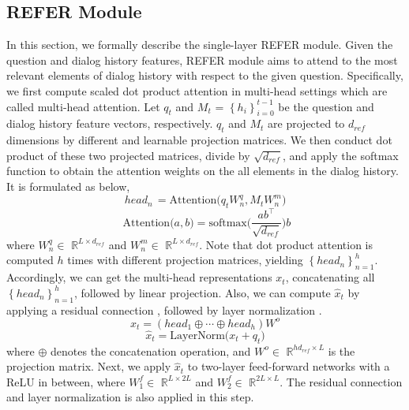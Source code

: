 \documentclass[11pt,a4paper]{article}
\begin{document}
\subsection{REFER Module}
\label{sec:refer}
In this section, we formally describe the single-layer REFER module. Given the question and dialog history features, REFER module aims to attend to the 
most relevant elements of dialog history with respect to the given question. Specifically, we first compute scaled dot product attention \cite{vaswani2017attention} in multi-head settings which are called multi-head attention. Let $q_{t}$ and $M_{t}$ = {\it $\left\{h_{i} \right\}_{i=0}^{t-1}$} be the question and dialog history feature vectors, respectively.  $q_{t}$ and $M_{t}$ are projected to $d_{ref}$ dimensions by different and learnable projection matrices. We then conduct dot product of these two projected matrices, divide by $\sqrt{d_{ref}}$, and apply the softmax function to obtain the attention weights on the all elements in the dialog history. It is formulated as below,
\begin{equation}
    head_n \mathrm{\, = Attention (} {q_{t}}W_n^q, {M_{t}}W_n^m \mathrm{)} 
\end{equation}
\begin{equation}
    \mathrm{\; Attention(} {a, b}  \mathrm{) = softmax(} { \frac{{ab}^\top}{\sqrt{{d_{ref}}}} \mathrm{)}}{b}
\end{equation}
where $W_n^q \in$ $\mathbb{R}^{L \times d_{ref}}$ and $W_n^m \in$ $\mathbb{R}^{L \times d_{ref}}$.  Note that dot product attention is computed $h$ times with different projection matrices, yielding {\it $\left\{head_n \right\}_{n=1}^{h}$}. Accordingly, we can get the multi-head representations $x_t$, concatenating all {\it $\left\{head_n \right\}_{n=1}^{h}$}, followed by linear projection. Also, we can compute $\hat{x}_t$ by applying a residual connection \cite{he2016deep}, followed by layer normalization \cite{ba2016layer}.
\begin{equation}
    {x_t} = \left( head_1 \oplus \cdots \oplus head_h \right)W^o  
\end{equation}
\begin{equation}
    {\hat{x}_t} = \mathrm{LayerNorm(} {x_t} + q_t \mathrm{)} 
\end{equation}
where $\oplus$ denotes the concatenation operation, and $W^o \in$ $\mathbb{R}^{hd_{ref} \times L}$ is the projection matrix. Next, we apply $\hat{x}_t$ to two-layer feed-forward networks with a ReLU in between, where $W_1^f \in$ $\mathbb{R}^{L \times 2L}$ and $W_2^f \in$ $\mathbb{R}^{2L \times L}$. The residual connection and layer normalization is also applied in this step.
\end{document}
